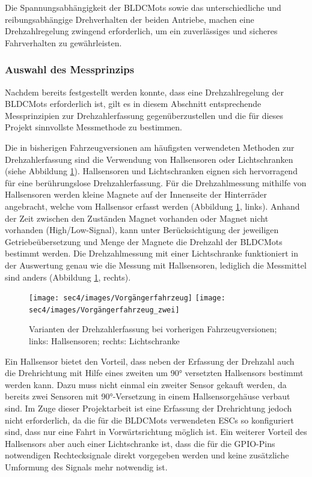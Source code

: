 Die Spannungsabhängigkeit der \acp{BLDCMot} sowie das unterschiedliche und reibungsabhängige Drehverhalten der beiden Antriebe, machen eine Drehzahlregelung zwingend erforderlich, um ein zuverlässiges und sicheres Fahrverhalten zu gewährleisten.

\subsubsection{Auswahl des Messprinzips}\label{Sec4Sub5Sub2}

Nachdem bereits festgestellt werden konnte, dass eine Drehzahlregelung der \acp{BLDCMot} erforderlich ist, gilt es in diesem Abschnitt entsprechende Messprinzipien zur Drehzahlerfassung gegenüberzustellen und die für dieses Projekt sinnvollste Messmethode zu bestimmen.\vspace{11pt}

Die in bisherigen Fahrzeugversionen am häufigsten verwendeten Methoden zur Drehzahlerfassung sind die Verwendung von Hallsensoren oder Lichtschranken (siehe Abbildung \ref{fig:Vorgaengerfahrzeug}). Hallsensoren und Lichtschranken eignen sich hervorragend für eine berührungslose Drehzahlerfassung. Für die Drehzahlmessung mithilfe von Hallsensoren werden kleine Magnete auf der Innenseite der Hinterräder angebracht, welche vom Hallsensor erfasst werden (Abbildung \ref{fig:Vorgaengerfahrzeug}, links). Anhand der Zeit zwischen den Zuständen \glqq{}Magnet vorhanden\grqq{} oder \glqq{}Magnet nicht vorhanden\grqq{} (High/Low-Signal), kann unter Berücksichtigung der jeweiligen Getriebeübersetzung und Menge der Magnete die Drehzahl der \acp{BLDCMot} bestimmt werden. Die Drehzahlmessung mit einer Lichtschranke funktioniert in der Auswertung genau wie die Messung mit  Hallsensoren, lediglich die Messmittel sind anders (Abbildung \ref{fig:Vorgaengerfahrzeug}, rechts).

\begin{figure}[H] %
\texttt{[image: sec4/images/Vorgängerfahrzeug]} 
\texttt{[image: sec4/images/Vorgängerfahrzeug\_zwei]} 
\captionsetup{width=.95\textwidth}
\centering
\caption[Varianten der Drehzahlerfassung bei vorherigen Fahrzeugversionen]{Varianten der Drehzahlerfassung bei vorherigen Fahrzeugversionen; links: Hallsensoren; rechts: Lichtschranke}\centering
\label{fig:Vorgaengerfahrzeug}
\end{figure}     


Ein Hallsensor bietet den Vorteil, dass neben der Erfassung der Drehzahl auch die Drehrichtung mit Hilfe eines zweiten um 90° versetzten Hallsensors bestimmt werden kann. Dazu muss nicht einmal ein zweiter Sensor gekauft werden, da bereits zwei Sensoren mit 90°-Versetzung in einem Hallsensorgehäuse verbaut sind. Im Zuge dieser Projektarbeit ist eine Erfassung der Drehrichtung jedoch nicht erforderlich, da die für die \acp{BLDCMot} verwendeten \acp{ESC} so konfiguriert sind, dass nur eine Fahrt in Vorwärtsrichtung möglich ist. Ein weiterer Vorteil des Hallsensors aber auch einer Lichtschranke ist, dass die für die GPIO-Pins notwendigen Rechtecksignale direkt vorgegeben werden und keine zusätzliche Umformung des Signals mehr notwendig ist. \vspace{11pt}

